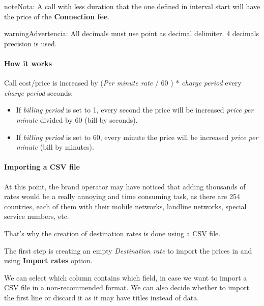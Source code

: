 \documentclass[letterpaper,10pt,spanish]{sphinxmanual}
\begin{document}
\begin{notice}{note}{Nota:}
A call with less duration that the one defined in interval start will have the price of the \textbf{Connection fee}.
\end{notice}

\begin{notice}{warning}{Advertencia:}
All decimals must use point as decimal delimiter. 4 decimals precision is used.
\end{notice}
\paragraph{How it works}

Call cost/price is increased by (\emph{Per minute rate} / 60 ) * \emph{charge period} every \emph{charge period} seconds:
\begin{itemize}
\item {} 
If \emph{billing period} is set to 1, every second the price will be increased
\emph{price per minute} divided by 60 (bill by seconds).

\item {} 
If \emph{billing period} is set to 60, every minute the price will be increased
\emph{price per minute} (bill by minutes).

\end{itemize}


\paragraph{Importing a CSV file}
\label{administration_portal/brand/billing/destination_rates:importing-a-csv-file}\label{administration_portal/brand/billing/destination_rates:id3}
At this point, the brand operator may have noticed that adding thousands
of rates would be a really annoying and time consuming task, as there
are 254 countries, each of them with their mobile networks, landline networks,
special service numbers, etc.

That's why the creation of destination rates is done using a
\href{https://es.wikipedia.org/wiki/CSV}{CSV} file.

The first step is creating an empty \emph{Destination rate} to import the prices in and using \textbf{Import rates} option.

We can select which column contains which field, in case we want to import a
\href{https://es.wikipedia.org/wiki/CSV}{CSV} file in a non-recommended format. We
can also decide whether to import the first line or discard it as it may have
titles instead of data.
\end{document}
